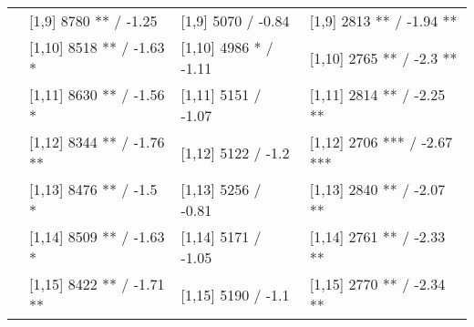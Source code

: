 \begin{table}
\begin{tabular}[t]{llll}
 & {}[1,9] 8780 ** / -1.25 & {}[1,9] 5070  / -0.84 & {}[1,9] 2813 ** / -1.94 **\\
 & {}[1,10] 8518 ** / -1.63 * & {}[1,10] 4986 * / -1.11 & {}[1,10] 2765 ** / -2.3 **\\
 & {}[1,11] 8630 ** / -1.56 * & {}[1,11] 5151  / -1.07 & {}[1,11] 2814 ** / -2.25 **\\
 & {}[1,12] 8344 ** / -1.76 ** & {}[1,12] 5122  / -1.2 & {}[1,12] 2706 *** / -2.67 ***\\
\addlinespace
 & {}[1,13] 8476 ** / -1.5 * & {}[1,13] 5256  / -0.81 & {}[1,13] 2840 ** / -2.07 **\\
 & {}[1,14] 8509 ** / -1.63 * & {}[1,14] 5171  / -1.05 & {}[1,14] 2761 ** / -2.33 **\\
 & {}[1,15] 8422 ** / -1.71 ** & {}[1,15] 5190  / -1.1 & {}[1,15] 2770 ** / -2.34 **\\
\bottomrule
\end{tabular}
\end{table}
